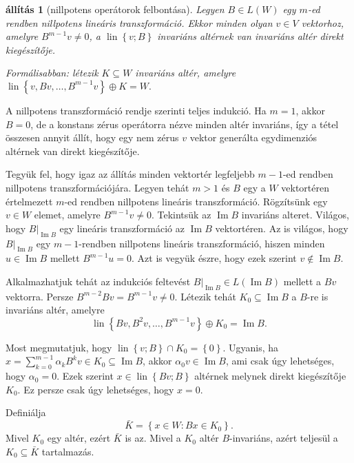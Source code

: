 \documentclass[9pt, a4paper, showtrims]{memoir}
\makeatletter
\renewenvironment{proof}[1][\proofname]
    {\par\pushQED{\qed}%
    \normalfont \topsep6\p@\@plus6\p@\relax
    \trivlist
    \item[\hskip\labelsep
        \itshape
    #1\@addpunct{:}]\ignorespaces}
    {\popQED\endtrivlist\@endpefalse}
\theoremstyle{plain}
\newtheorem{proposition}{állítás}[chapter]
\theoremstyle{remark}
\theoremstyle{definition}
\DeclareMathOperator{\lin}{lin}
\DeclareMathOperator{\im}{Im}
\makeatother
\begin{document}
\begin{proposition}[nillpotens operátorok felbontása]
    Legyen $B\in L\left( W \right)$ egy $m$-ed rendben nillpotens lineáris transzformáció.
    Ekkor minden olyan $v\in V$ vektorhoz, 
    amelyre $B^{m-1}v\neq 0$, a $\lin\left\{ v;B \right\}$ invariáns altérnek van invariáns altér 
    direkt kiegészítője.

    Formálisabban: létezik $K\subseteq W$ invariáns altér, amelyre
    \(
    \lin\left\{ v,Bv,\dots,B^{m-1}v \right\}\oplus K = W.
    \)
    \label{pr:nilpfelb}
\end{proposition}
\begin{proof}
    A nillpotens transzformáció rendje szerinti teljes indukció.
    Ha $m=1$, akkor $B=0$, de a konstans zérus operátorra nézve minden altér invariáns,
    így a tétel összesen annyit állít, hogy egy nem zérus $v$ vektor generálta egydimenziós altérnek van direkt kiegészítője.

    Tegyük fel, hogy igaz az állítás minden vektortér legfeljebb $m-1$-ed rendben nillpotens transzformációjára.
    Legyen tehát $m>1$ és $B$ egy a $W$ vektortéren értelmezett $m$-ed rendben nillpotens lineáris transzformáció.
    Rögzítsünk egy $v\in W$ elemet, amelyre $B^{m-1}v\neq 0$.
    Tekintsük az $\im B$ invariáns alteret.
    Világos, hogy $B|_{\im B}$ egy lineáris transzformáció az $\im B$ vektortéren.
    Az is világos, hogy $B|_{\im B}$ egy $m-1$-rendben nillpotens lineáris transzformáció, hiszen 
    minden $u\in\im B$ mellett $B^{m-1}u=0$.
    Azt is vegyük észre, hogy ezek szerint $v\notin\im B$.

    Alkalmazhatjuk tehát az indukciós feltevést $B|_{\im B}\in L\left( \im B \right)$ mellett a
    $Bv$ vektorra.
    Persze $B^{m-2}Bv=B^{m-1}v\neq 0$.
    Létezik tehát $K_0\subseteq\im B$ a $B$-re is invariáns altér, amelyre
    \[
        \lin\left\{ Bv,B^2v,\dots,B^{m-1}v \right\}\oplus K_0 = \im B.
    \]

    Most megmutatjuk, hogy $\lin\left\{ v;B \right\}\cap K_0=\left\{ 0 \right\}.$
    Ugyanis, ha 
    $
    x=\sum_{k=0}^{m-1}\alpha_kB^kv\in K_0\subseteq\im B
    $, akkor $\alpha_0v\in\im B$,
    ami csak úgy lehetséges, hogy $\alpha_0=0$.
    Ezek szerint $x\in\lin\left\{ Bv;B \right\}$ altérnek melynek direkt kiegészítője $K_0$.
    Ez persze csak úgy lehetséges, hogy $x=0$.

    Definiálja 
    \[
        \bar{K}=\left\{ x\in W:Bx\in K_0 \right\}.
    \]
    Mivel $K_0$ egy altér, ezért $\bar{K}$ is az.
    Mivel a $K_0$ altér $B$-invariáns, azért teljesül a $K_0\subseteq \bar{K}$ tartalmazás.


\end{proof}
\end{document}
